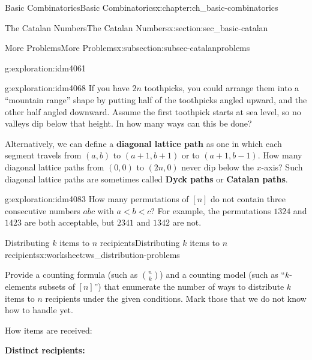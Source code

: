 \documentclass[oneside,10pt,]{book}
\newcommand{\terminology}[1]{\textbf{#1}}
\numberwithin{equation}{chapter}
\newcommand{\lt}{<}
\begin{document}
\begin{chapterptx}{Basic Combinatorics}{}{Basic Combinatorics}{}{}{x:chapter:ch_basic-combinatorics}
\begin{sectionptx}{The Catalan Numbers}{}{The Catalan Numbers}{}{}{x:section:sec_basic-catalan}
\begin{subsectionptx}{More Problems}{}{More Problems}{}{}{x:subsection:subsec-catalanproblems}
\begin{exploration}{}{g:exploration:idm4061}
\end{exploration}
\begin{exploration}{}{g:exploration:idm4068}%
If you have \(2n\) toothpicks, you could arrange them into a ``mountain range'' shape by putting half of the toothpicks angled upward, and the other half angled downward.  Assume the first toothpick starts at sea level, so no valleys dip below that height. In how many ways can this be done?%
\par
Alternatively, we can define a \terminology{diagonal lattice path} as one in which each segment travels from \((a,b)\) to \((a+1, b+1)\) or to \((a+1, b-1)\).  How many diagonal lattice paths from \((0,0)\) to \((2n,0)\) never dip below the \(x\)-axis?  Such diagonal lattice paths are sometimes called \terminology{Dyck paths} or \terminology{Catalan paths}.%
\end{exploration}
\begin{exploration}{}{g:exploration:idm4083}%
How many permutations of \([n]\) do not contain three consecutive numbers \(abc\) with \(a \lt b \lt c\)?  For example, the permutations \(1324\) and \(1423\) are both acceptable, but \(2341\) and \(1342\) are not.%
\end{exploration}
\end{subsectionptx}
\end{sectionptx}
%
%
\typeout{************************************************}
\typeout{************************************************}
%
\begin{worksheet-section}{Distributing \(k\) items to \(n\) recipients}{}{Distributing \(k\) items to \(n\) recipients}{}{}{x:worksheet:ws_distribution-problems}
\begin{introduction}{}%
Provide a counting formula (such as \(\binom{n}{k}\)) and a counting model (such as ``\(k\)-elements subsets of \([n]\)'') that enumerate the number of ways to distribute \(k\) items to \(n\) recipients under the given conditions.  Mark those that we do not know how to handle yet.%
\begin{sidebyside}{3}{0.0166666666666667}{0.0166666666666667}{0.0333333333333333}%
\begin{sbspanel}{0.3}%
How items are received:%
\end{sbspanel}%
\begin{sbspanel}{0.3}%
\par
\terminology{Distinct recipients:}%
\end{sbspanel}%

\end{sidebyside}
\end{introduction}
\end{worksheet-section}
\end{chapterptx}
\end{document}
